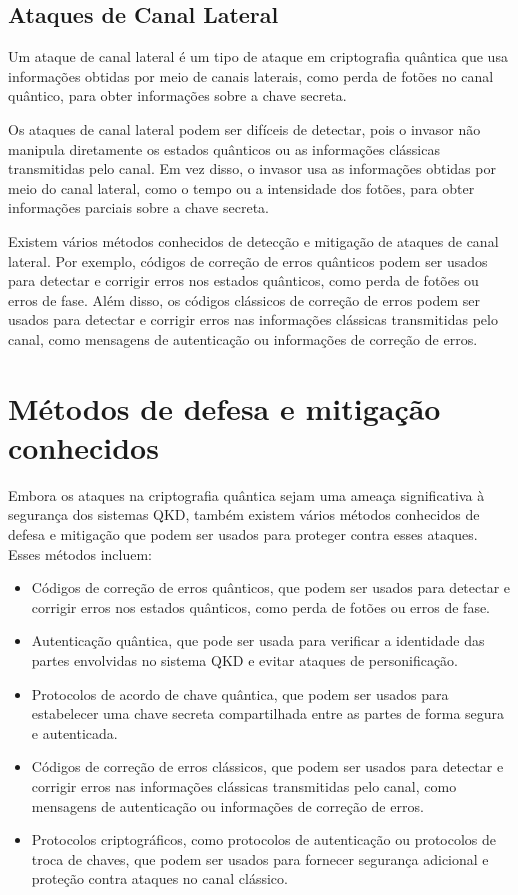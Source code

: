 \subsection{Ataques de Canal Lateral}

Um ataque de canal lateral é um tipo de ataque em criptografia quântica que usa informações obtidas por meio de canais laterais, como perda de fotões no canal quântico, para obter informações sobre a chave secreta.

Os ataques de canal lateral podem ser difíceis de detectar, pois o invasor não manipula diretamente os estados quânticos ou as informações clássicas transmitidas pelo canal. Em vez disso, o invasor usa as informações obtidas por meio do canal lateral, como o tempo ou a intensidade dos fotões, para obter informações parciais sobre a chave secreta.

Existem vários métodos conhecidos de detecção e mitigação de ataques de canal lateral. Por exemplo, códigos de correção de erros quânticos podem ser usados para detectar e corrigir erros nos estados quânticos, como perda de fotões ou erros de fase. Além disso, os códigos clássicos de correção de erros podem ser usados para detectar e corrigir erros nas informações clássicas transmitidas pelo canal, como mensagens de autenticação ou informações de correção de erros.

\section{Métodos de defesa e mitigação conhecidos}

Embora os ataques na criptografia quântica sejam uma ameaça significativa à segurança dos sistemas QKD, também existem vários métodos conhecidos de defesa e mitigação que podem ser usados para proteger contra esses ataques. Esses métodos incluem:

\begin{itemize}
  \item Códigos de correção de erros quânticos, que podem ser usados para detectar e corrigir erros nos estados quânticos, como perda de fotões ou erros de fase.
  \item Autenticação quântica, que pode ser usada para verificar a identidade das partes envolvidas no sistema QKD e evitar ataques de personificação.
  \item Protocolos de acordo de chave quântica, que podem ser usados para estabelecer uma chave secreta compartilhada entre as partes de forma segura e autenticada.
  \item Códigos de correção de erros clássicos, que podem ser usados para detectar e corrigir erros nas informações clássicas transmitidas pelo canal, como mensagens de autenticação ou informações de correção de erros.
  \item Protocolos criptográficos, como protocolos de autenticação ou protocolos de troca de chaves, que podem ser usados para fornecer segurança adicional e proteção contra ataques no canal clássico.
\end{itemize}

